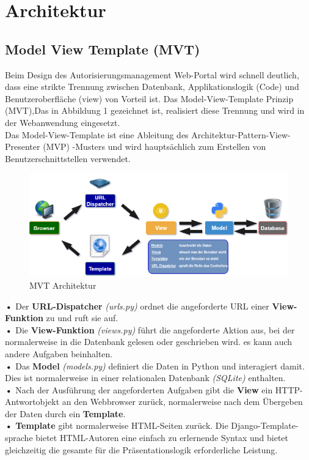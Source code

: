 \documentclass[parskip=full,11pt]{scrartcl}
\begin{document}
 
 \section{Architektur}
 
 \subsection{Model View Template (MVT)} \label{MVT}
Beim Design des Autorisierungsmanagement Web-Portal wird schnell deutlich, dass eine strikte Trennung
zwischen Datenbank, Applikationslogik (Code) und Benutzeroberfläche (view) von Vorteil ist. Das Model-View-Template Prinzip (MVT),Das in Abbildung 1 gezeichnet ist, realisiert diese Trennung und wird in der Webanwendung eingesetzt.\\
Das Model-View-Template ist eine Ableitung des Architektur-Pattern-View-Presenter (MVP) -Musters und wird hauptsächlich zum Erstellen von Benutzerschnittstellen verwendet.\\
 
 
 \begin{figure}[ht!]
 \includegraphics[width=1.1\textwidth]{res/MVTdiagramm.png}
  	 	\centering
  	    \caption{MVT Architektur}
 \end{figure}
  \newpage


 	\textbf{•} Der \textbf{URL-Dispatcher} \emph{(urls.py)} ordnet die angeforderte \gls{URL} einer \textbf{View-Funktion} zu und ruft sie auf.\\
 	\textbf{•} Die \textbf{View-Funktion} \emph{(views.py)} führt die angeforderte Aktion aus, bei der normalerweise in die Datenbank gelesen oder geschrieben wird. es kann auch andere Aufgaben beinhalten.\\
 	\textbf{•} Das \textbf{Model} \emph{(models.py)} definiert die Daten in Python und interagiert damit. Dies ist normalerweise in einer relationalen Datenbank \emph{(SQLite)} enthalten.\\
 	\textbf{•} Nach der Ausführung der angeforderten Aufgaben gibt die \textbf{View} ein HTTP-Antwortobjekt an den Webbrowser zurück, normalerweise nach dem Übergeben der Daten durch ein \textbf{Template}.\\
 	\textbf{•} \textbf{Template} gibt normalerweise \gls{HTML}-Seiten zurück. Die Django-Template-sprache bietet HTML-Autoren eine einfach zu erlernende Syntax und bietet gleichzeitig die gesamte für die Präsentationslogik erforderliche Leistung. \\
 	
\end{document}
